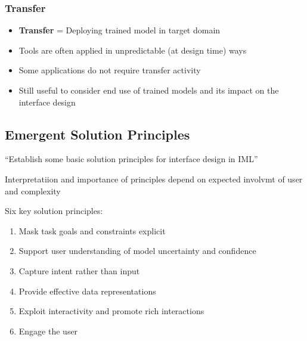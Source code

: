 \documentclass[12pt,a4paper]{article}
\begin{document}
\subsubsection{Transfer}
\begin{itemize}
\item \textbf{Transfer} = Deploying trained model in target domain
\item Tools are often applied in unpredictable (at design time) ways
\item Some applications do not require transfer activity
\item Still useful to consider end use of trained models and its impact on the interface design
\end{itemize}
%
%
\subsection{Emergent Solution Principles}
\begin{description}
\item ``Establish some basic solution principles for interface design in IML''
\item Interpretatiion and importance of principles depend on expected involvmt of user and complexity
\end{description}
Six key solution principles:
\begin{enumerate}
\item Mask task goals and constraints explicit
\item Support user understanding of model uncertainty and confidence
\item Capture intent rather than input
\item Provide effective data representations
\item Exploit interactivity and promote rich interactions
\item Engage the user
\end{enumerate}
\end{document}
